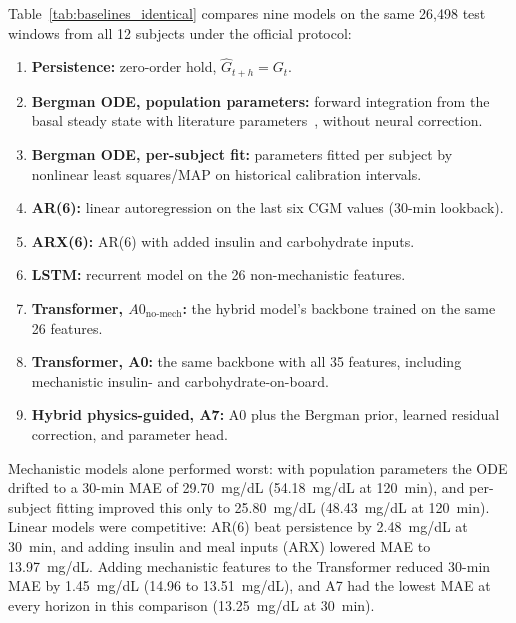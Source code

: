 \documentclass[journal]{IEEEtran}
\begin{document}
Table~\ref{tab:baselines_identical} compares nine models on the same 26,498 test windows from all 12 subjects under the official protocol:
\begin{enumerate}
    \item \textbf{Persistence:} zero-order hold, $\hat{G}_{t+h} = G_t$.
    \item \textbf{Bergman ODE, population parameters:} forward integration from the basal steady state with literature parameters~\cite{ref1,ref32}, without neural correction.
    \item \textbf{Bergman ODE, per-subject fit:} parameters fitted per subject by nonlinear least squares/MAP on historical calibration intervals.
    \item \textbf{AR(6):} linear autoregression on the last six CGM values (30-min lookback).
    \item \textbf{ARX(6):} AR(6) with added insulin and carbohydrate inputs.
    \item \textbf{LSTM:} recurrent model on the 26 non-mechanistic features.
    \item \textbf{Transformer, $A0_{\text{no-mech}}$:} the hybrid model's backbone trained on the same 26 features.
    \item \textbf{Transformer, A0:} the same backbone with all 35 features, including mechanistic insulin- and carbohydrate-on-board.
    \item \textbf{Hybrid physics-guided, A7:} A0 plus the Bergman prior, learned residual correction, and parameter head.
\end{enumerate}

Mechanistic models alone performed worst: with population parameters the ODE drifted to a 30-min MAE of 29.70~mg/dL (54.18~mg/dL at 120~min), and per-subject fitting improved this only to 25.80~mg/dL (48.43~mg/dL at 120~min). Linear models were competitive: AR(6) beat persistence by 2.48~mg/dL at 30~min, and adding insulin and meal inputs (ARX) lowered MAE to 13.97~mg/dL. Adding mechanistic features to the Transformer reduced 30-min MAE by 1.45~mg/dL (14.96 to 13.51~mg/dL), and A7 had the lowest MAE at every horizon in this comparison (13.25~mg/dL at 30~min).
\end{document}
